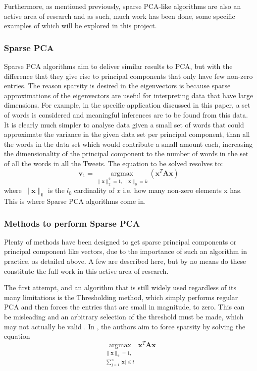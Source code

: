 \documentclass[11pt,a4paper]{article}
\begin{document}
Furthermore, as mentioned previously, sparse PCA-like algorithms are also an active area of research and as such, much work has been done, some specific examples of which will be explored in this project.

\subsubsection{Sparse PCA}

Sparse PCA algorithms aim to deliver similar results to PCA, but with the difference that they give rise to principal components that only have few non-zero entries. The reason sparsity is desired in the eigenvectors is because sparse approximations of the eigenvectors are useful for interpreting data that have large dimensions. For example, in the specific application discussed in this paper, a set of words is considered and meaningful inferences are to be found from this data. It is clearly much simpler to analyse data given a small set of words that could approximate the variance in the given data set per principal component, than all the words in the data set which would contribute a small amount each, increasing the dimensionality of the principal component to the number of words in the set of all the words in all the Tweets. The equation to be solved resolves to:
\begin{equation}
\mathbf{v}_1 = \underset{\|\mathbf{x}\|_2^2 = 1, \|\mathbf{x}\|_0 = k}{\operatorname{argmax}}\left( \mathbf{x}^T\mathbf{A}\mathbf{x}\right)
\end{equation}
where $\|\mathbf{x}\|_0$ is the $l_0$ cardinality of $x$ i.e. how many non-zero elements x has. This is where Sparse PCA algorithms come in. 

\subsubsection{Methods to perform Sparse PCA}
Plenty of methods have been designed to get sparse principal components or principal component like vectors, due to the importance of such an algorithm in practice, as detailed above. A few are described here, but by no means do these constitute the full work in this active area of research.
 
The first attempt, and an algorithm that is still widely used regardless of its many limitations is the Thresholding method, which simply performs regular PCA and then forces the entries that are small in magnitude, to zero. This can be misleading and an arbitrary selection of the threshold must be made, which may not actually be valid \cite{cadima}. In \cite{scotlass}, the authors aim to force sparsity by solving the equation
\begin{equation*}
\underset{\substack{\|\mathbf{x}\|_2 = 1, \\ \sum_{j=1}^n|\mathbf{x}| \leq t}}
{\operatorname{argmax}}\mathbf{x}^T\mathbf{A}\mathbf{x}
\end{equation*}
 
\end{document}
